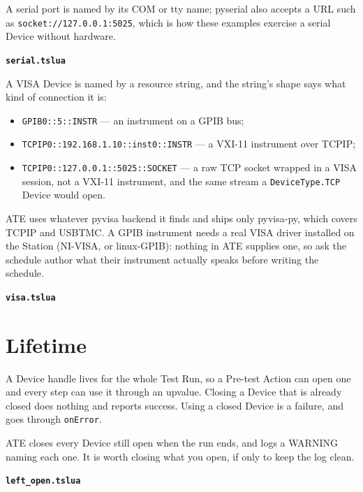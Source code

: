 A serial port is named by its COM or tty name; pyserial also accepts a URL such as
\texttt{socket://127.0.0.1:5025}, which is how these examples exercise a serial Device without
hardware.

\noindent\textbf{\texttt{serial.tslua}}\par


A VISA Device is named by a resource string, and the string's shape says what kind of connection
it is:

\begin{itemize}
  \item \texttt{GPIB0::5::INSTR} --- an instrument on a GPIB bus;
  \item \texttt{TCPIP0::192.168.1.10::inst0::INSTR} --- a VXI-11 instrument over TCPIP;
  \item \texttt{TCPIP0::127.0.0.1::5025::SOCKET} --- a raw TCP socket wrapped in a VISA session,
    not a VXI-11 instrument, and the same stream a \texttt{DeviceType.TCP} Device would open.
\end{itemize}

ATE uses whatever pyvisa backend it finds and ships only pyvisa-py, which covers TCPIP and USBTMC.
A GPIB instrument needs a real VISA driver installed on the Station (NI-VISA, or linux-GPIB):
nothing in ATE supplies one, so ask the schedule author what their instrument actually speaks
before writing the schedule.

\noindent\textbf{\texttt{visa.tslua}}\par


\section{Lifetime}

A Device handle lives for the whole Test Run, so a Pre-test Action can open one and every step
can use it through an upvalue. Closing a Device that is already closed does nothing and reports
success. Using a closed Device is a failure, and goes through \texttt{onError}.

ATE closes every Device still open when the run ends, and logs a WARNING naming each one. It is
worth closing what you open, if only to keep the log clean.

\noindent\textbf{\texttt{left\_open.tslua}}\par


